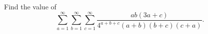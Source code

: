 Find the value of
\[\sum_{a = 1}^{\infty} \sum_{b = 1}^{\infty} \sum_{c = 1}^{\infty} \frac{ab(3a + c)}{4^{a+b+c} (a+b)(b+c)(c+a)}.\]